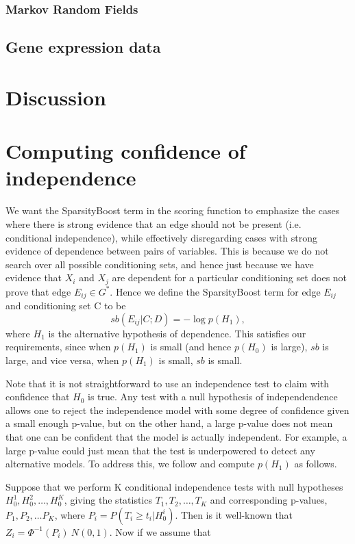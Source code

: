 \documentclass{article} %
\begin{document}
\subsubsection{Markov Random Fields}


\subsection{Gene expression data}

\section{Discussion}

\appendix
\section{Computing confidence of independence}
We want the SparsityBoost term in the scoring function to emphasize the cases where there is strong evidence that an edge should not be present (i.e. conditional independence), while effectively disregarding cases with strong evidence of dependence between pairs of variables.  This is because we do not search over all possible conditioning sets, and hence just because we have evidence that $X_i$ and $X_j$ are dependent for a particular conditioning set does not prove that edge $E_{ij} \in G^*$.  Hence we define the SparsityBoost term for edge $E_{ij}$ and conditioning set C to be $$sb(E_{ij} | C; D) = -\log p(H_1),$$ where $H_1$ is the alternative hypothesis of dependence.   This satisfies our requirements, since when $p(H_1)$ is small (and hence $p(H_0)$ is large), $sb$ is large, and vice versa, when $p(H_1)$ is small, $sb$ is small.  

Note that it is not straightforward to use an independence test to claim with confidence that $H_0$ is true.  Any test with a null hypothesis of independendence allows one to reject the independence model with some degree of confidence given a small enough p-value, but on the other hand, a large p-value does not mean that one can be confident that the model is actually independent.  For example, a large p-value could just mean that the test is underpowered to detect any alternative models.  To address this, we follow \cite{efron2004large} and compute $p(H_1)$ as follows.

Suppose that we perform K conditional independence tests with null hypotheses $H_0^1, H_0^2, \ldots, H_0^K$, giving the statistics $T_1, T_2, \ldots, T_K$ and corresponding p-values, $P_1, P_2, \ldots P_K$, where $P_i = P(T_i \geq t_i | H_0^i)$.  Then is it well-known that $Z_i = \Phi^{-1}(P_i) ~ N(0,1)$.  Now if we assume that 
\end{document}
